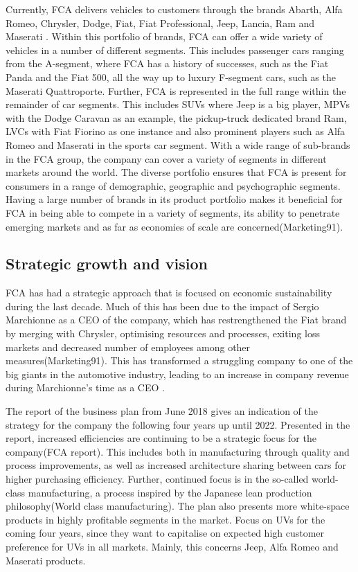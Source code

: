 Currently, FCA delivers vehicles to customers through the brands Abarth, Alfa Romeo, Chrysler, Dodge, Fiat, Fiat Professional, Jeep, Lancia, Ram and Maserati \cite{fca_overview}. Within this portfolio of brands, FCA can offer a wide variety of vehicles in a number of different segments. This includes passenger cars ranging from the A-segment, where FCA has a history of successes, such as the Fiat Panda and the Fiat 500, all the way up to luxury F-segment cars, such as the Maserati Quattroporte. 
Further, FCA is represented in the full range within the remainder of car segments. This includes SUVs where Jeep is a big player, MPVs with the Dodge Caravan as an example, the pickup-truck dedicated brand Ram, LVCs with Fiat Fiorino as one instance and also prominent players such as Alfa Romeo and Maserati in the sports car segment. With a wide range of sub-brands in the FCA group, the company can cover a variety of segments in different markets around the world. The diverse portfolio ensures that FCA is present for consumers in a range of demographic, geographic and psychographic segments. Having a large number of brands in its product portfolio makes it beneficial for FCA in being able to compete in a variety of segments, its ability to penetrate emerging markets and as far as economies of scale are concerned(Marketing91).


\subsection{Strategic growth and vision}
FCA has had a strategic approach that is focused on economic sustainability during the last decade. Much of this has been due to the impact of Sergio Marchionne as a CEO of the company, which has restrengthened the Fiat brand by merging with Chrysler, optimising resources and processes, exiting loss markets and decreased number of employees among other measures(Marketing91). This has transformed a struggling company to one of the big giants in the automotive industry, leading to an increase in company revenue during Marchionne’s time as a CEO \cite{fca_marchionne_fortune}\cite{statista_fca_net_revenues}.

The report of the business plan from June 2018 gives an indication of the strategy for the company the following four years up until 2022. Presented in the report, increased efficiencies are continuing to be a strategic focus for the company(FCA report). This includes both in manufacturing through quality and process improvements, as well as increased architecture sharing between cars for higher purchasing efficiency. Further, continued focus is in the so-called world-class manufacturing, a process inspired by the Japanese lean production philosophy(World class manufacturing). The plan also presents more white-space products in highly profitable segments in the market. Focus on UVs for the coming four years, since they want to capitalise on expected high customer preference for UVs in all markets. Mainly, this concerns Jeep, Alfa Romeo and Maserati products. 

